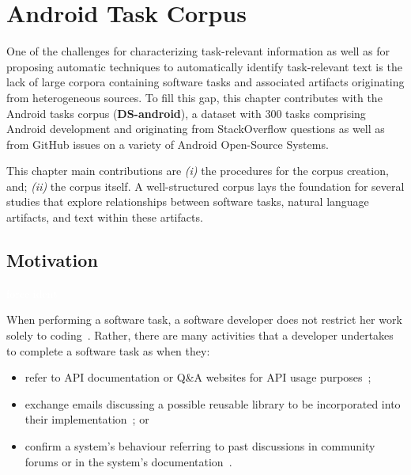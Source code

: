 \setcounter{chapter}{3}
\setcounter{rq}{1}


\chapter{Android Task Corpus}
\label{ch:android-corpus}



One of the challenges for characterizing task-relevant information as well as for proposing automatic techniques to automatically identify task-relevant text is 
the lack of large corpora containing 
software tasks and associated artifacts originating from heterogeneous sources.
To fill this gap, this chapter contributes with the Android tasks corpus (\textbf{\acs{DS-android}}), a dataset with 300 tasks comprising Android development and originating from StackOverflow questions 
as well as from GitHub issues on a variety of Android Open-Source Systems. 



This chapter main contributions are \textit{(i)} the procedures for the corpus creation, and; \textit{(ii)} the corpus itself. A well-structured corpus lays the foundation for several studies that explore relationships between software tasks, natural language artifacts, and text within these artifacts. 




\section{Motivation}
\textcolor{white}{force ident} %


When performing a software task, a software developer does not restrict her work 
solely to coding~\cite{Meyer2017}.
Rather, there are many activities that a developer undertakes to complete a software task
as when they:



\begin{itemize}
\item refer to API documentation or Q\&A websites for API usage purposes~\cite{umarji2008archetypal, Singer1998, robillard2011field};
\item exchange emails discussing a possible reusable library to be incorporated into their implementation~\cite{umarji2008archetypal, Bacchelli2012}; or
\item confirm a system's behaviour referring to past discussions in community forums or in the system's documentation~\cite{Arya2019, Lotufo2012, Singer1998}.
\end{itemize}
    

